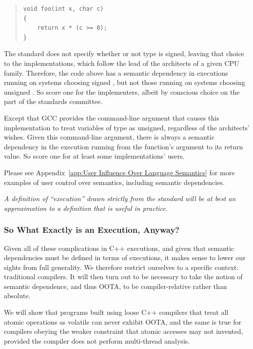 \documentclass[10]{article}
\begin{document}
\begin{quote}
\begin{verbatim}
void foo(int x, char c)
{
    return x * (c >= 0);
}
\end{verbatim}
\end{quote}

The standard does not specify whether or not type  is signed,
leaving that choice to the implementations, which follow the lead
of the architects of a given CPU family.
Therefore, the code above has a semantic dependency in executions running
on systems choosing signed , but not those running on systems
choosing unsigned .
So score one for the implementers, albeit by conscious choice on the
part of the standards committee.

Except that GCC provides the  command-line
argument that causes this implementation to treat variables of
type  as unsigned, regardless of the architects' wishes.
Given this command-line argument, there is always a semantic dependency
in the execution running from the  function's argument to its
return value.
So score one for at least some implementations' users.

Please see Appendix~\ref{app:User Influence Over Language Semantics}
for more examples of user control over semantics, including semantic
dependencies.

\emph{A definition of ``execution'' drawn strictly from the standard will
be at best an approximation to a definition that is useful in practice.}

\subsubsection{So What Exactly is an Execution, Anyway?}
\label{sec:So What Exactly is an Execution, Anyway?}

Given all of these complications in C++ executions, and given that
semantic dependencies must be defined in terms of executions, it makes
sense to lower our sights from full generality.
We therefore restrict ourselves to a specific context:
traditional compilers.
It will then turn out to be necessary to take the notion of semantic
dependence, and thus OOTA, to be compiler-relative rather than absolute.

We will show that programs built using loose C++ compilers that treat all
atomic operations as volatile can never exhibit OOTA, and the same is true
for compilers obeying the weaker constraint that atomic accesses may not
invented, provided the compiler does not perform multi-thread analysis.
\end{document}
